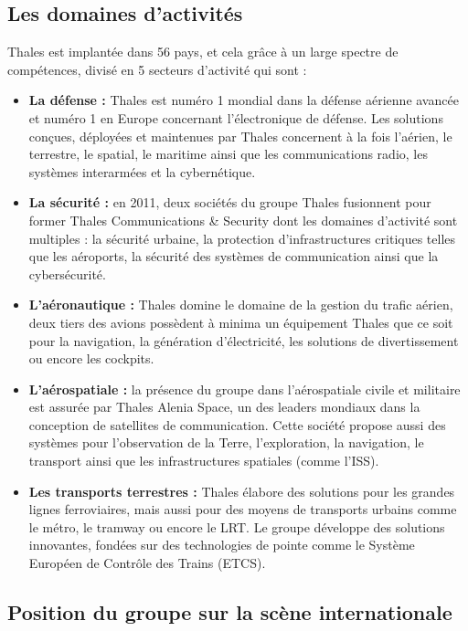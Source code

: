 \subsection{Les domaines d'activités}

Thales est implantée dans 56 pays, et cela grâce à un large spectre de compétences, divisé en 5 secteurs d'activité qui sont :
\begin{itemize}
\item \textbf{La défense : }Thales est numéro 1 mondial dans la défense aérienne avancée et numéro 1 en Europe concernant l'électronique de défense. Les solutions conçues, déployées et maintenues par Thales concernent à la fois l'aérien, le terrestre, le spatial, le maritime ainsi que les communications radio, les systèmes interarmées et la cybernétique.
\item \textbf{La sécurité :} en 2011, deux sociétés du groupe Thales fusionnent pour former Thales Communications \& Security dont les domaines d'activité sont multiples : la sécurité urbaine, la protection d'infrastructures critiques telles que les aéroports, la sécurité des systèmes de communication ainsi que la cybersécurité.
\item \textbf{L'aéronautique :} Thales domine le domaine de la gestion du trafic aérien, deux tiers des avions possèdent à minima un équipement Thales que ce soit pour la navigation, la génération d'électricité, les solutions de divertissement ou encore les cockpits.
\item \textbf{L'aérospatiale :} la présence du groupe dans l'aérospatiale civile et militaire est assurée par Thales Alenia Space, un des leaders mondiaux dans la conception de satellites de communication. Cette société propose aussi des systèmes pour l'observation de la Terre, l'exploration, la navigation, le transport ainsi que les infrastructures spatiales (comme l'ISS).

\item \textbf{Les transports terrestres :} Thales élabore des solutions pour les grandes lignes ferroviaires, mais aussi pour des moyens de transports urbains comme le métro, le tramway ou encore le \gls{LRT}.
Le groupe développe des solutions innovantes, fondées sur des technologies de pointe comme le Système Européen de Contrôle des Trains (ETCS).
\end{itemize}


\subsection{Position du groupe sur la scène internationale}

